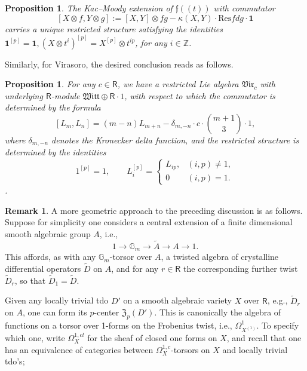 \documentclass{amsart}
\newtheorem{Prop}[Thm]{Proposition}
\theoremstyle{definition}
\newtheorem{Rem}[Thm]{Remark}
\newcommand{\on}{\mathrm}
\newcommand{\Ring}{\mathsf{R}}
\newcommand{\ff}{\mathfrak{f}}
\newcommand{\fZ}{\mathfrak{Z}}
\numberwithin{equation}{section}
\begin{document}
\begin{Prop} The Kac--Moody extension of $\ff(\!(t)\!)$ with commutator
$$[X \otimes f, Y \otimes g] := [X,Y] \otimes fg - \kappa(X,Y) \cdot \on{Res} fdg \cdot \mathbf{1}$$
carries a unique restricted structure satisfying the identities $\mathbf{1}^{[p]} = \mathbf{1}, (X \otimes t^i)^{[p]} = X^{[p]} \otimes t^{ip}$, for any $i \in \mathbb{Z}$. 
\end{Prop}


Similarly, for Virasoro, the desired conclusion reads as follows. 


\begin{Prop} For any $c \in \Ring$, we have a restricted Lie algebra $\mathfrak{Vir}_c$ with underlying $\Ring$-module $\mathfrak{Witt} \oplus \Ring \cdot 1$, with respect to which the commutator is determined by the formula 
$$[L_m , L_n] = (m-n) L_{m+n}  -  \delta_{m, -n} \cdot c \cdot \binom{m+1}{3}  \cdot 1,$$
where $\delta_{m, -n}$ denotes the Kronecker delta function, and the restricted structure is determined by the identities $$1^{[p]} = 1, \quad \quad L_i^{[p]} = \begin{cases} L_{ip}, & (i,p) \neq 1, \\ 0 & (i,p) = 1. \end{cases}$$. \end{Prop}



\begin{Rem} A more geometric approach to the preceding discussion is as follows. Suppose for simplicity one considers a central extension of a finite dimensional smooth algebraic group $A$, i.e.,
$$1 \rightarrow \mathbb{G}_m \rightarrow \widetilde{A} \rightarrow A \rightarrow 1.$$
This affords, as with any $\mathbb{G}_m$-torsor over $A$, a twisted algebra of crystalline differential operators $\widetilde{D}$ on $A$, and for any $r \in \Ring$ the corresponding further twist $\widetilde{D}_r$, so that $\widetilde{D}_1 = \widetilde{D}$.

Given any locally trivial tdo $D'$ on a smooth algebraic variety $X$ over $\Ring$, e.g., $\widetilde{D}_r$ on $A$, one can form its $p$-center $\fZ_p(D')$. This is canonically the algebra of functions on a torsor over 1-forms on the Frobenius twist, i.e., $\Omega^1_{X^{(1)}}$. To specify which one, write $\Omega^{1,cl}_X$ for the sheaf of closed one forms on $X$, and recall that one has an equivalence of categories between $\Omega^{1,c}_X$-torsors on $X$ and locally trivial tdo's; 


\end{Rem}
\end{document}
